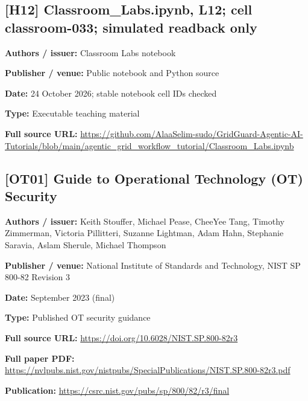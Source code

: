 \documentclass[10pt,letterpaper]{article}
\begin{document}
\subsection*{[H12] Classroom\_Labs.ipynb, L12; cell classroom-033; simulated readback only}
\textbf{Authors / issuer:} Classroom Labs notebook\par
\textbf{Publisher / venue:} Public notebook and Python source\par
\textbf{Date:} 24 October 2026; stable notebook cell IDs checked\par
\textbf{Type:} Executable teaching material\par
\textbf{Full source URL:} \href{https://github.com/AlaaSelim-sudo/GridGuard-Agentic-AI-Tutorials/blob/main/agentic_grid_workflow_tutorial/Classroom_Labs.ipynb}{\small\ttfamily https:/\allowbreak{}/\allowbreak{}github.\allowbreak{}com/\allowbreak{}AlaaSelim-\allowbreak{}sudo/\allowbreak{}GridGuard-\allowbreak{}Agentic-\allowbreak{}AI-\allowbreak{}Tutorials/\allowbreak{}blob/\allowbreak{}main/\allowbreak{}agentic\_\allowbreak{}grid\_\allowbreak{}workflow\_\allowbreak{}tutorial/\allowbreak{}Classroom\_\allowbreak{}Labs.\allowbreak{}ipynb}\par
\par\medskip
\subsection*{[OT01] Guide to Operational Technology (OT) Security}
\textbf{Authors / issuer:} Keith Stouffer, Michael Pease, CheeYee Tang, Timothy Zimmerman, Victoria Pillitteri, Suzanne Lightman, Adam Hahn, Stephanie Saravia, Aslam Sherule, Michael Thompson\par
\textbf{Publisher / venue:} National Institute of Standards and Technology, NIST SP 800-82 Revision 3\par
\textbf{Date:} September 2023 (final)\par
\textbf{Type:} Published OT security guidance\par
\textbf{Full source URL:} \href{https://doi.org/10.6028/NIST.SP.800-82r3}{\small\ttfamily https:/\allowbreak{}/\allowbreak{}doi.\allowbreak{}org/\allowbreak{}10.\allowbreak{}6028/\allowbreak{}NIST.\allowbreak{}SP.\allowbreak{}800-\allowbreak{}82r3}\par
\textbf{Full paper PDF:} \href{https://nvlpubs.nist.gov/nistpubs/SpecialPublications/NIST.SP.800-82r3.pdf}{\small\ttfamily https:/\allowbreak{}/\allowbreak{}nvlpubs.\allowbreak{}nist.\allowbreak{}gov/\allowbreak{}nistpubs/\allowbreak{}SpecialPublications/\allowbreak{}NIST.\allowbreak{}SP.\allowbreak{}800-\allowbreak{}82r3.\allowbreak{}pdf}\par
\textbf{Publication:} \href{https://csrc.nist.gov/pubs/sp/800/82/r3/final}{\small\ttfamily https:/\allowbreak{}/\allowbreak{}csrc.\allowbreak{}nist.\allowbreak{}gov/\allowbreak{}pubs/\allowbreak{}sp/\allowbreak{}800/\allowbreak{}82/\allowbreak{}r3/\allowbreak{}final}\par
\par\medskip
\end{document}
